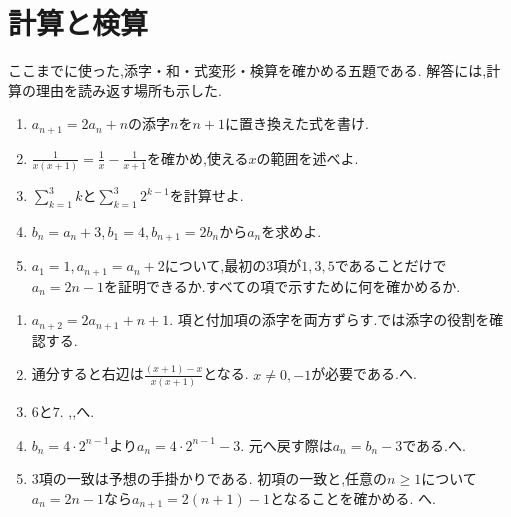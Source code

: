 \section{計算と検算}\label{節：読む前の確認}
ここまでに使った,添字・和・式変形・検算を確かめる五題である.
解答には,計算の理由を読み返す場所も示した.

    \noindent{}\par\nobreak
    \begin{enumerate}[format=\bookitemlink{reading-check}{problem}{answer}]
      \item $a_{n+1}=2a_n+n$の添字$n$を$n+1$に置き換えた式を書け.
      \item $\displaystyle\frac1{x(x+1)}=\frac1x-\frac1{x+1}$を確かめ,使える$x$の範囲を述べよ.
      \item $\displaystyle\sum_{k=1}^{3}k$と$\displaystyle\sum_{k=1}^{3}2^{k-1}$を計算せよ.
      \item $b_n=a_n+3$,\,$b_1=4$,\,$b_{n+1}=2b_n$から$a_n$を求めよ.
      \item $a_1=1$,\,$a_{n+1}=a_n+2$について,最初の3項が$1,3,5$であることだけで$a_n=2n-1$を証明できるか.すべての項で示すために何を確かめるか.
    \end{enumerate}

    \noindent{}\par\nobreak
    \begin{enumerate}[format=\bookitemlink{reading-check}{answer}{problem}]
      \item $a_{n+2}=2a_{n+1}+n+1$.
            項と付加項の添字を両方ずらす.では添字の役割を確認する.
      \item 通分すると右辺は$\displaystyle\frac{(x+1)-x}{x(x+1)}$となる.
            $x\ne0,-1$が必要である.へ.
      \item $6$と$7$.
            ,,へ.
      \item $b_n=4\cdot2^{n-1}$より$a_n=4\cdot2^{n-1}-3$.
            元へ戻す際は$a_n=b_n-3$である.へ.
      \item 3項の一致は予想の手掛かりである.
            初項の一致と,任意の$n\ge1$について$a_n=2n-1$なら$a_{n+1}=2(n+1)-1$となることを確かめる.
            へ.
    \end{enumerate}
